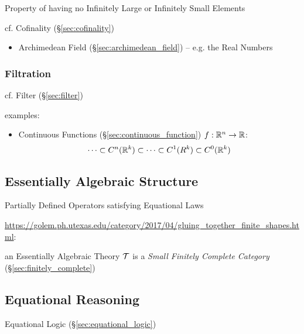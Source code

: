 Property of having no Infinitely Large or Infinitely Small Elements

cf. Cofinality (\S\ref{sec:cofinality})

\begin{itemize}
  \item Archimedean Field (\S\ref{sec:archimedean_field}) -- e.g. the Real
    Numbers
\end{itemize}



\subsubsection{Filtration}\label{sec:filtration}

cf. Filter (\S\ref{sec:filter})

examples:
\begin{itemize}
  \item Continuous Functions (\S\ref{sec:continuous_function})
    $f : \mathbb{R}^n \rightarrow \mathbb{R}$:
    \[
      \cdots \subset C^n(\mathbb{R}^k) \subset \cdots \subset C^1(R^k) \subset
        C^0(\mathbb{R}^k)
    \]
\end{itemize}



\subsection{Essentially Algebraic Structure}
\label{sec:essentially_algebraic}

Partially Defined Operators satisfying Equational Laws

\url{https://golem.ph.utexas.edu/category/2017/04/gluing_together_finite_shapes.html}:

an Essentially Algebraic Theory $\mathcal{T}$ is a \emph{Small Finitely Complete
  Category} (\S\ref{sec:finitely_complete})



\subsection{Equational Reasoning}\label{sec:equational_reasoning}

Equational Logic (\S\ref{sec:equational_logic})



